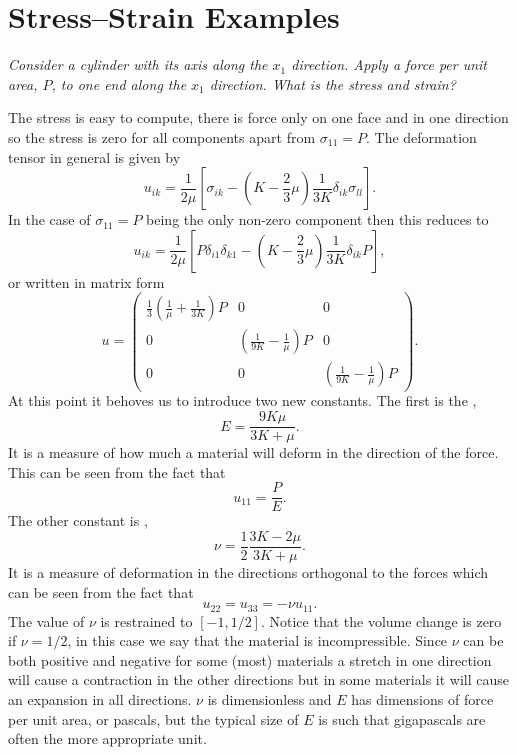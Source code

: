 \documentclass[a4paper]{article}
\begin{document}
    \section{Stress--Strain Examples}
    \begin{example}
        \itshape
        Consider a cylinder with its axis along the \(x_1\) direction.
        Apply a force per unit area, \(P\), to one end along the \(x_1\) direction.
        What is the stress and strain?
        
        \normalfont
        The stress is easy to compute, there is force only on one face and in one direction so the stress is zero for all components apart from \(\sigma_{11} = P\).
        The deformation tensor in general is given by
        \[u_{ik} = \frac{1}{2\mu} \left[ \sigma_{ik} - \left( K - \frac{2}{3}\mu \right) \frac{1}{3K}\delta_{ik}\sigma_{ll} \right].\]
        In the case of \(\sigma_{11} = P\) being the only non-zero component then this reduces to
        \[u_{ik} = \frac{1}{2\mu}\left[ P\delta_{i1}\delta_{k1} -  \left( K - \frac{2}{3}\mu \right) \frac{1}{3K} \delta_{ik}P \right],\]
        or written in matrix form
        \[
            u =
            \begin{pmatrix}
                \frac{1}{3}\left( \frac{1}{\mu} + \frac{1}{3K} \right)P &0 & 0\\
                0 & \left( \frac{1}{9K} - \frac{1}{\mu} \right)P & 0\\
                0 & 0 & \left( \frac{1}{9K} - \frac{1}{\mu} \right)P
            \end{pmatrix}
            .
        \]
        At this point it behoves us to introduce two new constants.
        The first is the ,
        \[E = \frac{9K\mu}{3K + \mu}.\]
        It is a measure of how much a material will deform in the direction of the force.
        This can be seen from the fact that
        \[u_{11} = \frac{P}{E}.\]
        The other constant is ,
        \[\nu = \frac{1}{2} \frac{3K - 2\mu}{3K + \mu}.\]
        It is a measure of deformation in the directions orthogonal to the forces which can be seen from the fact that
        \[u_{22} = u_{33} = -\nu u_{11}.\]
        The value of \(\nu\) is restrained to \([-1, 1/2]\).
        Notice that the volume change is zero if \(\nu = 1/2\), in this case we say that the material is incompressible.
        Since \(\nu\) can be both positive and negative for some (most) materials a stretch in one direction will cause a contraction in the other directions but in some materials it will cause an expansion in all directions.
        \(\nu\) is dimensionless and \(E\) has dimensions of force per unit area, or pascals, but the typical size of \(E\) is such that gigapascals are often the more appropriate unit.
    \end{example}
\end{document}
